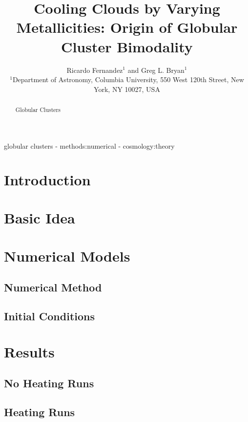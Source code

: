 \documentclass[useAMS,usenatbib]{mn2e}
\title{Cooling Clouds by Varying Metallicities: Origin of Globular Cluster Bimodality}
\author[R. Fernandez et al.]{Ricardo Fernandez$^{1}$ and Greg L. Bryan$^{1}$\\
$^{1}$Department of Astronomy, Columbia University, 550 West 120th Street, New York, NY 10027, USA}
\begin{document}
\date{}


\maketitle


\begin{abstract}
Globular Clusters
\end{abstract}

\begin{keywords}
globular clusters - methods:numerical - cosmology:theory
\end{keywords}

%
\section{Introduction}

%
\section{Basic Idea}
\label{sec:basic}

%
\section{Numerical Models}
\label{sec:numerical}
\subsection{Numerical Method}
\subsection{Initial Conditions}

% 
\section{Results}
\label{sec:results}
\subsection{No Heating Runs}
\subsection{Heating Runs}
\end{document}
